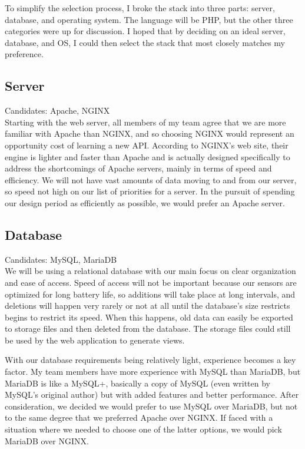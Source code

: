 \documentclass[letterpaper,10pt,titlepage]{article}
\begin{document}
To simplify the selection process, I broke the stack into three parts: server, database, and operating system. The language will be PHP, but the other three categories were up for discussion. I hoped that by deciding on an ideal server, database, and OS, I could then select the stack that most closely matches my preference.

\subsection{Server}

\normalsize Candidates: Apache, NGINX
\\

\small Starting with the web server, all members of my team agree that we are more familiar with Apache than NGINX, and so choosing NGINX would represent an opportunity cost of learning a new API. According to NGINX’s web site, their engine is lighter and faster than Apache and is actually designed specifically to address the shortcomings of Apache servers, mainly in terms of speed and efficiency. We will not have vast amounts of data moving to and from our server, so speed not high on our list of priorities for a server. In the pursuit of spending our design period as efficiently as possible, we would prefer an Apache server.\cite{NGINX}

\subsection{Database}

\normalsize Candidates: MySQL, MariaDB
\\

\small We will be using a relational database with our main focus on clear organization and ease of access. Speed of access will not be important because our sensors are optimized for long battery life, so additions will take place at long intervals, and deletions will happen very rarely or not at all until the database's size restricts begins to restrict its speed. When this happens, old data can easily be exported to storage files and then deleted from the database. The storage files could still be used by the web application to generate views.
 
With our database requirements being relatively light, experience becomes a key factor. My team members have more experience with MySQL than MariaDB, but MariaDB is like a MySQL+, basically a copy of MySQL (even written by MySQL’s original author) but with added features and better performance. After consideration, we decided we would prefer to use MySQL over MariaDB, but not to the same degree that we preferred Apache over NGINX. If faced with a situation where we needed to choose one of the latter options, we would pick MariaDB over NGINX.\cite{panoply}
\end{document}
